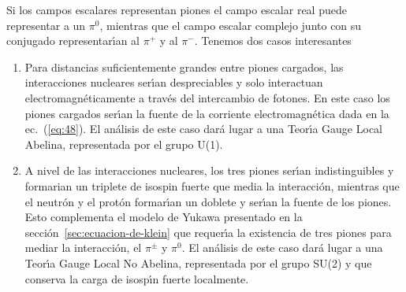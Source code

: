Si los campos escalares representan piones el campo escalar real puede
representar a un $\pi^0$, mientras que el campo escalar complejo junto
con su conjugado representar\'\i an al $\pi^+$ y al $\pi^-$. Tenemos dos casos
interesantes
\begin{enumerate} %
\item Para distancias suficientemente grandes entre piones cargados, las
interacciones nucleares ser\'\i an despreciables y solo interactuan
electromagn\'eticamente a trav\'es del intercambio de fotones. En este
caso los piones cargados ser\'\i an la fuente de la corriente
electromagn\'etica dada en la ec.~(\ref{eq:48}). El an\'alisis de este
caso dar\'a lugar a una Teor\'\i a Gauge Local Abelina, representada por el
grupo U(1).
\label{item:1} %

\item A nivel de las interacciones nucleares, los tres piones ser\'\i an
indistinguibles y formarian un triplete de isospin fuerte que media la
interacci\'on, mientras que el neutr\'on y el prot\'on formar\'\i an un doblete
y ser\'\i an la fuente de los piones. Esto complementa el modelo de Yukawa presentado en la secci\'on~\ref{sec:ecuacion-de-klein} que requer\'\i a la existencia de tres piones para mediar la interacci\'on, el $\pi^\pm$ y $\pi^0$.  El an\'alisis de este
caso dar\'a lugar a una Teor\'\i a Gauge Local No Abelina, representada por el
grupo SU(2) y que conserva la carga de isosp\'\i n fuerte localmente.
\label{item:2} %

\end{enumerate} %

